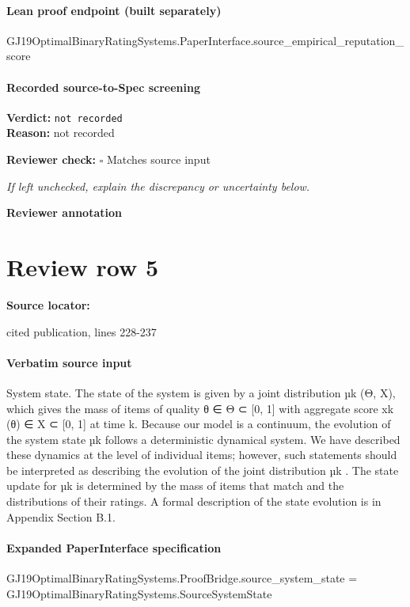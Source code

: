 \documentclass[10pt]{article}
\newcommand{\reviewerbox}{%
  \par\noindent\fbox{\parbox{0.96\linewidth}{\rule{0pt}{0.38in}}}\par
}
\newcommand{\reviewmatch}[1]{%
  \par\noindent\textbf{Reviewer check:} $\square$\; #1\par
  \noindent\emph{If left unchecked, explain the discrepancy or uncertainty below.}\par
}
\begin{document}
\paragraph{Lean proof endpoint (built separately)}\begin{ReviewVerbatim}
GJ19OptimalBinaryRatingSystems.PaperInterface.source_empirical_reputation_score
\end{ReviewVerbatim}

\paragraph{Recorded source-to-Spec screening}
\textbf{Verdict:} \texttt{not recorded}
\\
\textbf{Reason:} not recorded
\reviewmatch{Matches source input}
\noindent\textbf{Reviewer annotation}\par
\reviewerbox
\clearpage
\hypertarget{source-claim-ab291bf70e6ff37c}{}
\section*{Review row 5}
\textbf{Source locator:} {\footnotesize\raggedright cited publication, lines 228-\allowbreak{}237\par}
\paragraph{Verbatim source input}
\begin{ReviewVerbatim}
System state. The state of the system is given by a
joint distribution µk (Θ, X), which gives the mass of
items of quality θ ∈ Θ ⊂ [0, 1] with aggregate score
xk (θ) ∈ X ⊂ [0, 1] at time k. Because our model is
a continuum, the evolution of the system state µk
follows a deterministic dynamical system.
We have described these dynamics at the level of individual items; however, such statements should be
interpreted as describing the evolution of the joint
distribution µk . The state update for µk is determined by the mass of items that match and the distributions of their ratings. A formal description of
the state evolution is in Appendix Section B.1.
\end{ReviewVerbatim}


\paragraph{Expanded PaperInterface specification}
\begin{ReviewVerbatim}
GJ19OptimalBinaryRatingSystems.ProofBridge.source_system_state = GJ19OptimalBinaryRatingSystems.SourceSystemState
\end{ReviewVerbatim}
\end{document}
